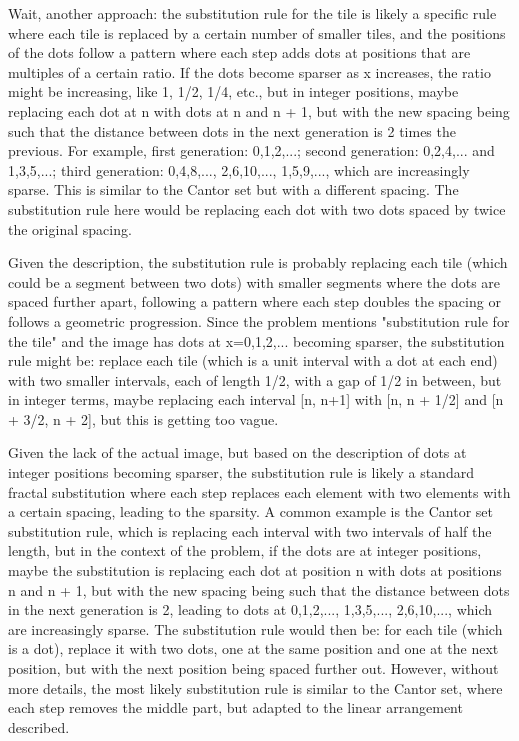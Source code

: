 Wait, another approach: the substitution rule for the tile is likely a specific rule where each tile is replaced by a certain number of smaller tiles, and the positions of the dots follow a pattern where each step adds dots at positions that are multiples of a certain ratio. If the dots become sparser as x increases, the ratio might be increasing, like 1, 1/2, 1/4, etc., but in integer positions, maybe replacing each dot at n with dots at n and n + 1, but with the new spacing being such that the distance between dots in the next generation is 2 times the previous. For example, first generation: 0,1,2,...; second generation: 0,2,4,... and 1,3,5,...; third generation: 0,4,8,..., 2,6,10,..., 1,5,9,..., which are increasingly sparse. This is similar to the Cantor set but with a different spacing. The substitution rule here would be replacing each dot with two dots spaced by twice the original spacing. 

Given the description, the substitution rule is probably replacing each tile (which could be a segment between two dots) with smaller segments where the dots are spaced further apart, following a pattern where each step doubles the spacing or follows a geometric progression. Since the problem mentions "substitution rule for the tile" and the image has dots at x=0,1,2,... becoming sparser, the substitution rule might be: replace each tile (which is a unit interval with a dot at each end) with two smaller intervals, each of length 1/2, with a gap of 1/2 in between, but in integer terms, maybe replacing each interval [n, n+1] with [n, n + 1/2] and [n + 3/2, n + 2], but this is getting too vague. 

Given the lack of the actual image, but based on the description of dots at integer positions becoming sparser, the substitution rule is likely a standard fractal substitution where each step replaces each element with two elements with a certain spacing, leading to the sparsity. A common example is the Cantor set substitution rule, which is replacing each interval with two intervals of half the length, but in the context of the problem, if the dots are at integer positions, maybe the substitution is replacing each dot at position n with dots at positions n and n + 1, but with the new spacing being such that the distance between dots in the next generation is 2, leading to dots at 0,1,2,..., 1,3,5,..., 2,6,10,..., which are increasingly sparse. The substitution rule would then be: for each tile (which is a dot), replace it with two dots, one at the same position and one at the next position, but with the next position being spaced further out. However, without more details, the most likely substitution rule is similar to the Cantor set, where each step removes the middle part, but adapted to the linear arrangement described. 

